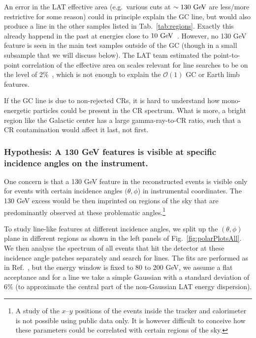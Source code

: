 \documentclass[aps,twocolumn,prd,superscriptaddress,showpacs,nofootinbib,fixfloat]{revtex4}
\newcommand{\GeV}{{\rm ~GeV}}
\newcommand{\degree}{^{\rm o}}
\begin{document}
An error in the LAT effective area (e.g.~various cuts at $\sim130\GeV$ are
less/more restrictive for some reason) %
could
in principle explain the GC line, but would also produce a line in the other
samples listed in Tab.~\ref{tab:regions}. %
Exactly this already happend in the past at energies close to
$10\GeV$~\cite{Ackermann:2012qk}.
However, no 130 GeV feature
is seen in the main test samples outside of the GC (though in a small subsample
that we will discuss below). The LAT team
estimated the point-to-point correlation of the effective area on scales
relevant for line searches to be on the level of
$2\%$~\cite{Fermi:caveatsPASS7},
which is not enough to explain the $\mathcal{O}(1)$ GC or Earth limb features.

If the GC line is due to non-rejected CRs, it is hard to understand how
mono-energetic particles could be present in the CR spectrum. 
What is more,
a bright region like the Galactic center has a large gamma-ray-to-CR
ratio, such that a CR contamination would affect it last, not first.

\subsubsection{Hypothesis: A 130 GeV features is visible
at specific incidence angles on the instrument.}


One concern is that a 130 GeV feature in the
reconstructed events is visible only for events with certain
incidence angles $(\theta, \phi$) in instrumental
coordinates. The 130 GeV excess would be then imprinted on
regions of the sky that are predominantly observed at
these problematic angles.\footnote{A study of the
$x$--$y$ positions of the events inside the tracker and calorimeter
is not possible using public data only.
It is however difficult to conceive how these 
parameters could be correlated with certain regions of the
sky.}

To study line-like features at different incidence
angles, we split up the $(\theta, \phi)$ plane in different
regions as shown in the left panels of
Fig.~\ref{fig:polarPlotsAll}. We then analyse the spectrum
of all events that hit the detector at these incidence
angle patches separately and search for lines. The fits are
performed as in Ref.~\cite{Weniger:2012}, but the energy
window is fixed to 80 to 200 GeV, we assume a flat
acceptance and for a line we take a simple Gaussian with a 
standard deviation of $6\%$ (to approximate the central part of the non-Gaussian
LAT energy dispersion).
\end{document}
